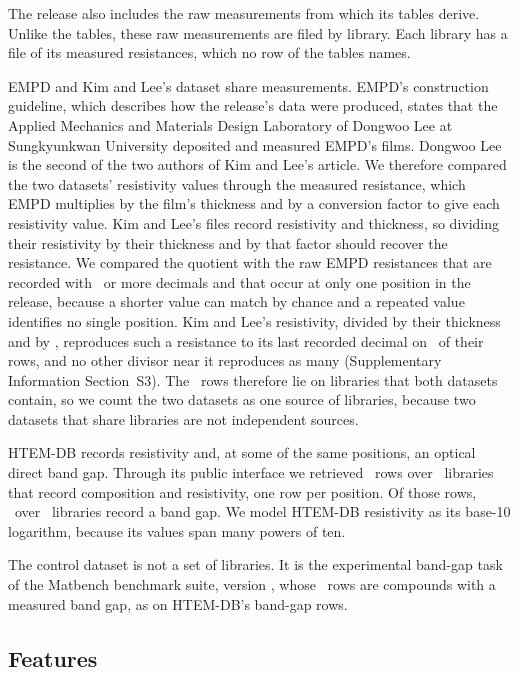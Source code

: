 \documentclass[11pt]{article}
\begin{document}
The release also includes the raw measurements from which its tables derive.
Unlike the tables, these
raw measurements are filed by library. Each library has a file of
its measured resistances, which no row of the tables names.

EMPD and Kim and Lee's dataset share measurements. EMPD's construction
guideline, which describes how the release's data were produced, states that
the Applied Mechanics and Materials Design Laboratory of Dongwoo Lee at
Sungkyunkwan University deposited and measured
EMPD's films.\cite{aihubGuideline} Dongwoo Lee is the second of the two
authors of Kim and Lee's article. We therefore compared the two datasets'
resistivity values through the measured resistance, which EMPD multiplies by the film's
thickness and by a conversion factor to give each resistivity value. Kim and
Lee's files record resistivity and thickness, so dividing their resistivity by
their thickness and by that factor should recover the resistance. We compared
the quotient with the raw EMPD resistances that are recorded with \npjSharedMinDecimals\ or more
decimals and that occur at only one position in the release, because a shorter
value can match by chance and a repeated value identifies no single position. Kim
and Lee's resistivity, divided by their thickness and by \npjSharedFactor,
reproduces such a resistance to its last recorded decimal on \npjSharedRows\ of
their rows, and no other divisor near it reproduces as many (Supplementary
Information Section~S3). The \npjSharedRows\ rows therefore lie on
libraries that both datasets contain, so we count the two datasets as one source of libraries, because two datasets
that share libraries are not independent sources.

HTEM-DB records resistivity and, at some of the same positions, an optical
direct band gap.\cite{zakutayev2018htem} Through its public interface we
retrieved \htemResRows\ rows over \htemResLibraries\ libraries that record
composition and resistivity, one row per position. Of those rows, \htemGapRows\ over
\htemGapLibraries\ libraries record a band gap. We model HTEM-DB resistivity as
its base-10 logarithm, because its values span many powers of ten.

The control dataset is not a set of libraries. It is the experimental band-gap
task of the Matbench benchmark suite, version
\exptGapVersion,\cite{zhuo2018bandgap,dunn2020matbench} whose \exptGapRows\
rows are compounds with a measured band gap, as on HTEM-DB's band-gap rows.

\subsection*{Features}
\label{sec:features}
\end{document}
